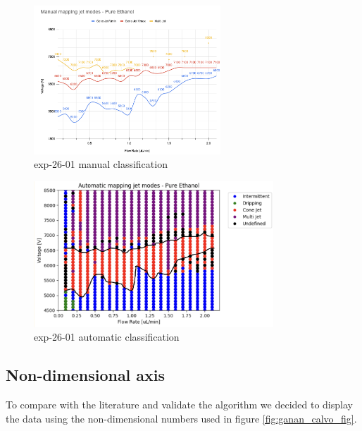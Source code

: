         \begin{multicols}{2}


            \begin{figure}[H]
                \center
                \includegraphics[width=7cm]{Figuras/report4/map7-manual.png}
                \caption{ exp-26-01 manual classification}
            \end{figure}

            \begin{figure}[H]
                \center
                \includegraphics[width=9cm]{Figuras/report4/map7-automatic-line.png}
                \caption{ exp-26-01 automatic classification}
            \end{figure}


        \end{multicols}

        \subsection{Non-dimensional axis}

        To compare with the literature and validate the algorithm we decided to display the data using the non-dimensional numbers used in figure \ref{fig:ganan_calvo_fig}.


